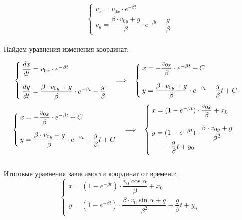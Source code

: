 \[
\begin{cases}
v_x = v_{0x} \cdot e^{-\beta t} \\[14pt]
v_y = \dfrac{\beta \cdot v_{0y} + g}{\beta} \cdot e^{-\beta t} - \dfrac{g}{\beta}
\end{cases}
\]\\
Найдем уравнения изменения координат: 

\[
\begin{cases}
\dfrac{dx}{dt} = v_{0x} \cdot e^{-\beta t} \\[14pt]
\dfrac{dy}{dt} = \dfrac{\beta \cdot v_{0y} + g}{\beta} \cdot e^{-\beta t} - \dfrac{g}{\beta}
\end{cases}
\Longrightarrow \; \; \;
\begin{cases}
x = -\dfrac{v_{0x}}{\beta} \cdot e^{-\beta t} + C\\[14pt]
y = \dfrac{\beta \cdot v_{0y} + g}{\beta} \cdot e^{-\beta t} - \dfrac{g}{\beta}t + C
\end{cases}
\]
\[
\begin{cases}
x = -\dfrac{v_{0x}}{\beta} \cdot e^{-\beta t} + C\\[14pt]
y = \dfrac{\beta \cdot v_{0y} + g}{\beta} \cdot e^{-\beta t} - \dfrac{g}{\beta}t + C
\end{cases}
\Longrightarrow \; \; \;
\begin{cases}
x = (1-e^{-\beta t})\cdot \dfrac{v_{0x}}{\beta} + x_0\\[14pt]
y = (1-e^{-\beta t}) \cdot \dfrac{\beta \cdot v_{0y} + g}{\beta^2} - \\ \; \; \; \; \; \; \; - \dfrac{g}{\beta}t + y_0
\end{cases}
\] \\
Итоговые уравнения зависимости координат от времени:
\[
\begin{cases}
x = (1-e^{-\beta t})\cdot \dfrac{v_0 \cos{\alpha}}{\beta} + x_0\\[14pt]
y = (1-e^{-\beta t}) \cdot \dfrac{\beta \cdot v_0 \sin{\alpha} + g}{\beta^2} - \dfrac{g}{\beta}t + y_0
\end{cases}
\]
